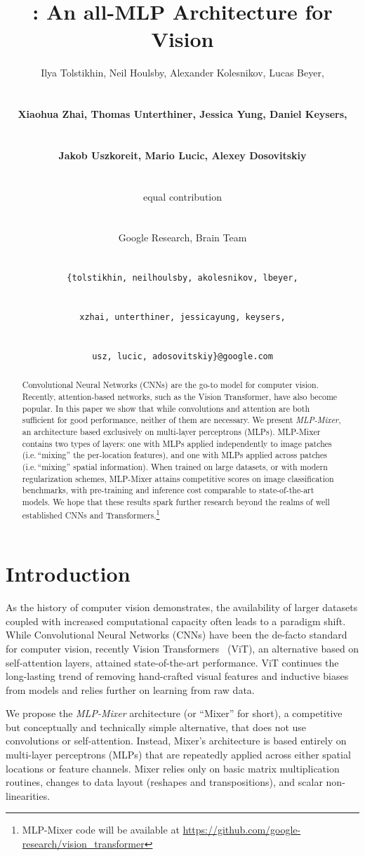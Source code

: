 \documentclass{article}
\title{\fullname{}: An all-MLP Architecture for Vision}
\author{\centerline{Ilya Tolstikhin, Neil Houlsby, Alexander Kolesnikov, Lucas Beyer,} \vspace{2mm}\\
    \centerline{\textbf{Xiaohua Zhai, Thomas Unterthiner, Jessica Yung, Daniel Keysers,}} \vspace{2mm}\\
    \centerline{\textbf{Jakob Uszkoreit, Mario Lucic, Alexey Dosovitskiy}} \vspace{1.5mm}\\
    \centerline{equal contribution} \vspace{1.5mm} \\
    \centerline{Google Research, Brain Team} \vspace{1.5mm} \\
    \centerline{\texttt{{\{tolstikhin, neilhoulsby, akolesnikov, lbeyer,}}} \\
    \centerline{\texttt{{xzhai, unterthiner, jessicayung, keysers,}}} \\
    \centerline{\texttt{{usz, lucic, adosovitskiy\}}@google.com}}
}
\newcommand{\fullname}{MLP-Mixer}
\newcommand{\name}{Mixer}
\begin{document}
\maketitle



\begin{abstract}
Convolutional Neural Networks (CNNs) are the go-to model for computer vision.
Recently, attention-based networks, such as the Vision Transformer, have also become popular.
In this paper we show that while convolutions and attention are both sufficient for good performance, neither of them are necessary.
We present \emph{\fullname{}}, an architecture based exclusively on multi-layer perceptrons (MLPs).
\fullname{} contains two types of layers: one with MLPs applied independently to image patches (i.e.\,``mixing'' the per-location features), and one with MLPs applied across patches (i.e.\,``mixing'' spatial information).
When trained on large datasets, or with modern regularization schemes, \fullname{} attains competitive scores on image classification benchmarks, with  pre-training and inference cost comparable to state-of-the-art models.
We hope that these results spark further research beyond the realms of well established CNNs and Transformers.\footnote{\fullname{} code will be available at \url{https://github.com/google-research/vision_transformer}}
\end{abstract}

\section{Introduction}

As the history of computer vision demonstrates, the availability of larger datasets coupled with increased computational capacity often leads to a paradigm shift.
While Convolutional Neural Networks (CNNs) have been the de-facto standard for computer vision, recently Vision Transformers~\citep{Dosovitskiy2021} (ViT), an alternative based on self-attention layers, attained state-of-the-art performance.
ViT continues the long-lasting trend of removing hand-crafted visual features and inductive biases from models and relies further on learning from raw data.

We propose the \emph{\fullname{}} architecture (or ``\name{}'' for short), a competitive but conceptually and technically simple alternative, that does not use convolutions or self-attention.
Instead, \name{}'s architecture is based entirely on multi-layer perceptrons (MLPs) that are repeatedly applied across either spatial locations or feature channels.
\name{} relies only on basic matrix multiplication routines, changes to data layout (reshapes and transpositions), and scalar non-linearities.
 
\end{document}
